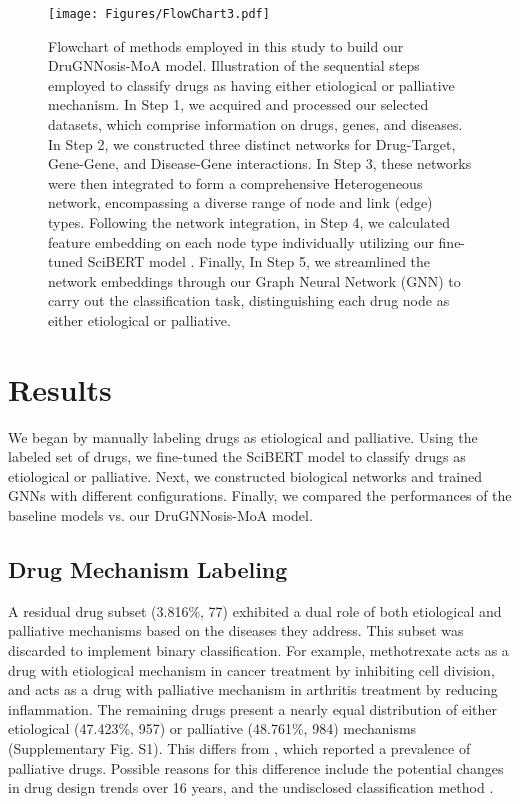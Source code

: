 \documentclass[journal,twoside,web]{ieeecolor}
\begin{document}
\begin{figure}
    \centering
    \texttt{[image: Figures/FlowChart3.pdf]}
    \caption{Flowchart of methods employed in this study to build our DruGNNosis-MoA model.
            Illustration of the sequential steps employed to classify drugs as having either etiological or palliative mechanism.
            In Step 1, we acquired and processed our selected datasets, which comprise information on drugs, genes, and diseases.
            In Step 2, we constructed three distinct networks for Drug-Target, Gene-Gene, and Disease-Gene interactions.
            In Step 3, these networks were then integrated to form a comprehensive Heterogeneous network, encompassing a diverse range of node and link (edge) types.
            Following the network integration, in Step 4, we calculated feature embedding on each node type individually utilizing our fine-tuned SciBERT model \cite{beltagy2019scibert}.
            Finally, In Step 5, we streamlined the network embeddings through our Graph Neural Network (GNN) to carry out the classification task, distinguishing each drug node as either etiological or palliative.
    }
    \label{fig:FlowChart}
\end{figure}


\section{Results}
\label{sec:res}
We began by manually labeling drugs as etiological and palliative.
Using the labeled set of drugs, we fine-tuned the SciBERT model to classify drugs as etiological or palliative.
Next, we constructed biological networks and trained GNNs with different configurations.
Finally, we compared the performances of the baseline models vs. our DruGNNosis-MoA model.

\subsection{Drug Mechanism Labeling}
A residual drug subset (3.816\%, 77) exhibited a dual role of both etiological and palliative mechanisms based on the diseases they address.
This subset was discarded to implement binary classification.
For example, methotrexate acts as a drug with etiological mechanism in cancer treatment by inhibiting cell division, and acts as a drug with palliative mechanism in arthritis treatment by reducing inflammation.
The remaining drugs present a nearly equal distribution of either etiological (47.423\%, 957) or palliative (48.761\%, 984) mechanisms (Supplementary Fig. S1). %
This differs from \cite{yildirim2007drug}, which reported a prevalence of palliative drugs.
Possible reasons for this difference include the potential changes in drug design trends over 16 years, and the undisclosed classification method \cite{yildirim2007drug}.
\end{document}
